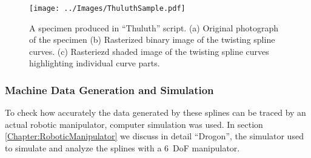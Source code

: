 \begin{figure}
  \centering
  \texttt{[image: ../Images/ThuluthSample.pdf]}
  \caption{A specimen produced in ``Thuluth'' script. (a) Original photograph of the specimen (b) Rasterized binary image of the twisting spline curves. (c) Rasteriezd shaded image of the twisting spline curves highlighting individual curve parts.
  }
  \label{Fig:Thuluth}
\end{figure}

\subsubsection{Machine Data Generation and Simulation}
To check how accurately the data generated by these splines can be traced by an actual robotic manipulator, computer simulation was used. In section \ref{Chapter:RoboticManipulator} we discuss in detail ``Drogon'', the simulator used to simulate and analyze the splines with a $6$~DoF manipulator.

